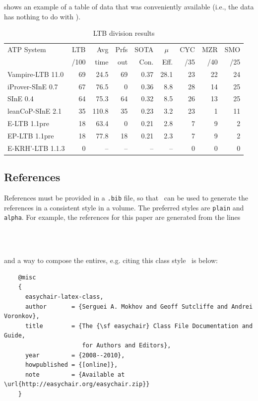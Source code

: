 \documentclass{easychair}
\newcommand{\easychair}{\sf{easychair}}
\begin{document}
 shows an example of a table of data that was
conveniently available (i.e., the data has nothing to do with {\easychair}).

\begin{table}[htp]
	\begin{centering}
		\begin{tabular}{lrrrrrrrr}
		\hline
		ATP System            & LTB & Avg  &Prfs & SOTA & \multicolumn{1}{c}{$\mu$} & CYC & MZR & SMO \\
		                      & /100& time & out & Con. & Eff. & /35 & /40 & /25 \\
		\hline
		Vampire-LTB 11.0      &  69 & 24.5 &  69 & 0.37 & 28.1 &  23 &  22 &  24 \\
		iProver-SInE 0.7      &  67 & 76.5 &   0 & 0.36 &  8.8 &  28 &  14 &  25 \\
		SInE 0.4              &  64 & 75.3 &  64 & 0.32 &  8.5 &  26 &  13 &  25 \\
		leanCoP-SInE 2.1      &  35 &110.8 &  35 & 0.23 &  3.2 &  23 &   1 &  11 \\
		E-LTB 1.1pre          &  18 & 63.4 &   0 & 0.21 &  2.8 &   7 &   9 &   2 \\
		EP-LTB 1.1pre         &  18 & 77.8 &  18 & 0.21 &  2.3 &   7 &   9 &   2 \\
		E-KRH'-LTB 1.1.3      &   0 &   -- &  -- &   -- &   -- &   0 &   0 &   0 \\
		\hline
		\end{tabular}
		\caption{LTB division results}
		\label{tab:ltbexample}
	\end{centering}
\end{table}

\subsection{References}
\label{sect:references}

References must be provided in a {\tt .bib} file, so that \BibTeX\ can
be used to generate the references in a consistent style in a volume.
The preferred styles are {\tt plain} and {\tt alpha}.
For example, the references for this paper are generated from the
lines
\begin{verbatim}
    
    
\end{verbatim}
and a way to compose the entires, e.g. citing this class style~\cite{easychair-latex-class}
is below:
\tiny
\begin{verbatim}
    @misc
    {
      easychair-latex-class,
      author       = {Serguei A. Mokhov and Geoff Sutcliffe and Andrei Voronkov},
      title        = {The {\sf easychair} Class File Documentation and Guide,
                      for Authors and Editors},
      year         = {2008--2010},
      howpublished = {[online]},
      note         = {Available at \url{http://easychair.org/easychair.zip}}
    }
\end{verbatim}
\normalsize
\end{document}
